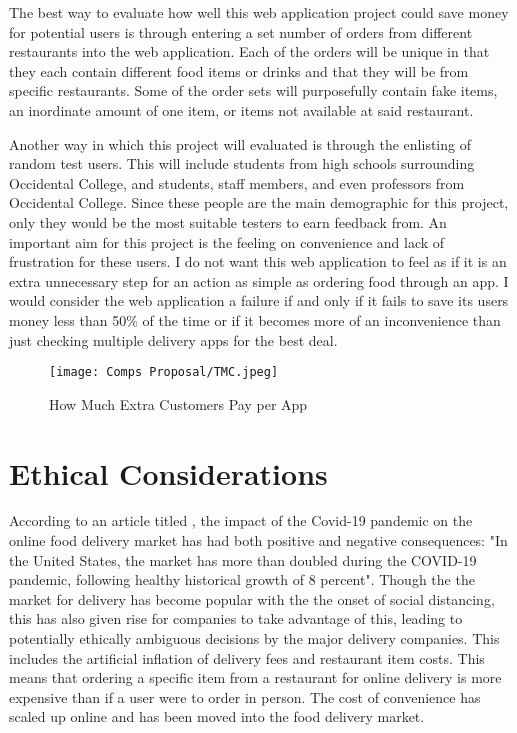 \documentclass[10pt,twocolumn]{article}
\begin{document}
The best way to evaluate how well this web application project could save money for potential users is through entering a set number of orders from different restaurants into the web application. Each of the orders will be unique in that they each contain different food items or drinks and that they will be from specific restaurants. Some of the order sets will purposefully contain fake items, an inordinate amount of one item, or items not available at said restaurant.

Another way in which this project will evaluated is through the enlisting of random test users. This will include students from high schools surrounding Occidental College, and students, staff members, and even professors from Occidental College. Since these people are the main demographic for this project, only they would be the most suitable testers to earn feedback from. An important aim for this project is the feeling on convenience and lack of frustration for these users. I do not want this web application to feel as if it is an extra unnecessary step for an action as simple as ordering food through an app. I would consider the web application a failure if and only if it fails to save its users money less than 50\% of the time or if it becomes more of an inconvenience than just checking multiple delivery apps for the best deal.

\begin{figure}
    \centering
    \texttt{[image: Comps Proposal/TMC.jpeg]}
    \caption{
        How Much Extra Customers Pay per App
    }
    \label{fig:second-page-5}
\end{figure}

\section{Ethical Considerations}

According to an article titled , the impact of the Covid-19 pandemic on the online food delivery market has had both positive and negative consequences: "In the United States, the market has more than doubled during the COVID-19 pandemic, following healthy historical growth of 8 percent". Though the the market for delivery has become popular with the the onset of social distancing, this has also given rise for companies to take advantage of this, leading to potentially ethically ambiguous decisions by the major delivery companies. This includes the artificial inflation of delivery fees and restaurant item costs. This means that ordering a specific item from a restaurant for online delivery is more expensive than if a user were to order in person. The cost of convenience has scaled up online and has been moved into the food delivery market.
\end{document}

